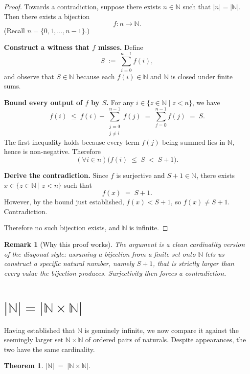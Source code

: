 \documentclass[11pt]{article}
\theoremstyle{defstyle}
\theoremstyle{thmstyle}
\newtheorem{theorem}{Theorem}[section]
\theoremstyle{notstyle}
\newtheorem*{remark}{Remark}
\theoremstyle{cautionstyle}
\newcommand{\N}{\mathbb{N}}
\begin{document}
\begin{proof}
Towards a contradiction, suppose there exists $n \in \N$ such that $|n| = |\N|$.
Then there exists a bijection
\[
  f : n \longrightarrow \N.
\]
(Recall $n = \{0, 1, \dots, n-1\}$.)

\medskip
\noindent\textbf{Construct a witness that $f$ misses.} Define
\[
  S \;:=\; \sum_{i=0}^{n-1} f(i),
\]
and observe that $S \in \N$ because each $f(i) \in \N$ and $\N$ is closed under
finite sums.

\medskip
\noindent\textbf{Bound every output of $f$ by $S$.} For any
$i \in \{z \in \N \mid z < n\}$, we have
\[
  f(i)
  \;\leq\; f(i) + \!\!\sum_{\substack{j=0 \\ j \neq i}}^{n-1}\!\! f(j)
  \;=\; \sum_{j=0}^{n-1} f(j)
  \;=\; S.
\]
The first inequality holds because every term $f(j)$ being summed lies in
$\N$, hence is non-negative. Therefore
\[
  (\forall i \in n)\bigl(f(i) \;\leq\; S \;<\; S+1\bigr).
\]

\medskip
\noindent\textbf{Derive the contradiction.} Since $f$ is surjective and
$S+1 \in \N$, there exists $x \in \{z \in \N \mid z < n\}$ such that
\[
  f(x) \;=\; S + 1.
\]
However, by the bound just established, $f(x) < S+1$, so $f(x) \neq S+1$.
Contradiction.

\medskip
Therefore no such bijection exists, and $\N$ is infinite.
\end{proof}

\begin{notebox}
\begin{remark}[Why this proof works]
The argument is a clean cardinality version of the diagonal style: assuming a
bijection from a finite set onto $\N$ lets us \emph{construct} a specific
natural number, namely $S+1$, that is strictly larger than every value the
bijection produces. Surjectivity then forces a contradiction.
\end{remark}
\end{notebox}

\section{$|\N| = |\N \times \N|$}

Having established that $\N$ is genuinely infinite, we now compare it against
the seemingly larger set $\N \times \N$ of ordered pairs of naturals. Despite
appearances, the two have the same cardinality.

\begin{thmbox}
\begin{theorem}
$|\N| \;=\; |\N \times \N|.$
\end{theorem}
\end{thmbox}
\end{document}
